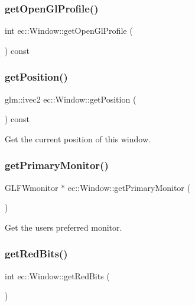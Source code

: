 \subsubsection{\texorpdfstring{get\+Open\+Gl\+Profile()}{getOpenGlProfile()}}
{\footnotesize\ttfamily int ec\+::\+Window\+::get\+Open\+Gl\+Profile (\begin{DoxyParamCaption}{ }\end{DoxyParamCaption}) const}

\mbox{\label{classec_1_1_window_aa426ec0e5657e6f5583f28abf1f4455a}} 
\subsubsection{\texorpdfstring{get\+Position()}{getPosition()}}
{\footnotesize\ttfamily glm\+::ivec2 ec\+::\+Window\+::get\+Position (\begin{DoxyParamCaption}{ }\end{DoxyParamCaption}) const}

Get the current position of this window. \mbox{\label{classec_1_1_window_ae519ec5a903d9ed1cefec30a4571a938}} 
\subsubsection{\texorpdfstring{get\+Primary\+Monitor()}{getPrimaryMonitor()}}
{\footnotesize\ttfamily G\+L\+F\+Wmonitor $\ast$ ec\+::\+Window\+::get\+Primary\+Monitor (\begin{DoxyParamCaption}{ }\end{DoxyParamCaption})\hspace{0.3cm}{\ttfamily [static]}}

Get the user\textquotesingle{}s preferred monitor. \mbox{\label{classec_1_1_window_aac6cd3cb2a9d033e41bbd04e84a7be14}} 
\subsubsection{\texorpdfstring{get\+Red\+Bits()}{getRedBits()}}
{\footnotesize\ttfamily int ec\+::\+Window\+::get\+Red\+Bits (\begin{DoxyParamCaption}{ }\end{DoxyParamCaption})\hspace{0.3cm}{\ttfamily [static]}}

